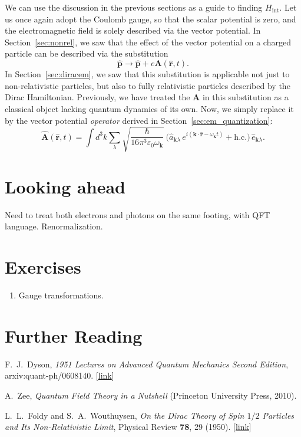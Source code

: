 \documentclass[pra,12pt]{revtex4}
\begin{document}
We can use the discussion in the previous sections as a guide to
finding $H_{\mathrm{int}}$.  Let us once again adopt the Coulomb
gauge, so that the scalar potential is zero, and the electromagnetic
field is solely described via the vector potential.  In
Section~\ref{sec:nonrel}, we saw that the effect of the vector
potential on a charged particle can be described via the substitution
\begin{equation}
  \hat{\mathbf{p}} \rightarrow \hat{\mathbf{p}} +
  e\mathbf{A}(\hat{\mathbf{r}},t).
\end{equation}
In Section~\ref{sec:diracem}, we saw that this substitution is
applicable not just to non-relativistic particles, but also to fully
relativistic particles described by the Dirac Hamiltonian.
Previously, we have treated the $\mathbf{A}$ in this substitution as a
classical object lacking quantum dynamics of its own.  Now, we simply
replace it by the vector potential \textit{operator} derived in
Section~\ref{sec:em_quantization}:
\begin{equation}
  \hat{\mathbf{A}}(\hat{\mathbf{r}},t) = \int d^3k \sum_{\lambda} 
  \sqrt{\frac{\hbar}{16\pi^3\varepsilon_0\omega_{\mathbf{k}}}}\,
  \Big(\hat{a}_{\mathbf{k}\lambda} \, e^{i(\mathbf{k}\cdot\hat{\mathbf{r}} - \omega_{\mathbf{k}} t)}
  + \mathrm{h.c.}\Big)\, \hat{e}_{\mathbf{k}\lambda}.
\end{equation}

\section{Looking ahead}

Need to treat both electrons and photons on the same footing, with QFT
language.  Renormalization.

\section*{Exercises}

\begin{enumerate}
\item Gauge transformations.
\end{enumerate}

\section*{Further Reading}

\begin{enumerate}[[1{]}]
\item F.~J.~Dyson, \textit{1951 Lectures on Advanced Quantum Mechanics
  Second Edition}, arxiv:quant-ph/0608140. [\href{https://arxiv.org/abs/quant-ph/0608140}{link}]
\label{cite:dyson}

\item A.~Zee, \textit{Quantum Field Theory in a Nutshell} (Princeton
  University Press, 2010).
\label{cite:zee}

\item L.~L.~Foldy and S.~A.~Wouthuysen, \textit{On the Dirac Theory of
  Spin $1/2$ Particles and Its Non-Relativistic Limit}, Physical
  Review \textbf{78}, 29 (1950). [\href{https://journals.aps.org/pr/abstract/10.1103/PhysRev.78.29}{link}]
\label{cite:foldy}
\end{enumerate}
\end{document}
